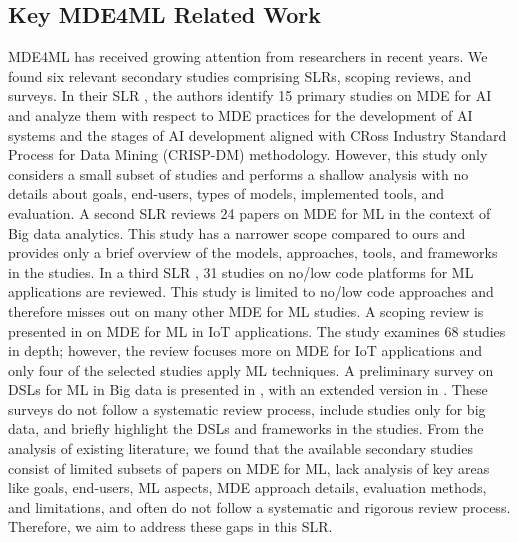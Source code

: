 \subsection{Key MDE4ML Related Work}
MDE4ML has received growing attention from researchers in recent years. We found six relevant secondary studies comprising SLRs, scoping reviews, and surveys. In their SLR \cite{raedler2023model}, the authors identify 15 primary studies on MDE for AI and analyze them with respect to MDE practices for the development of AI systems and the stages of AI development aligned with CRoss Industry Standard Process for Data Mining (CRISP-DM) \cite{wirth2000crisp} methodology. However, this study only considers a small subset of studies and performs a shallow analysis with no details about goals, end-users, types of models, implemented tools, and evaluation. A second SLR \cite{zafar2017systematic} reviews 24 papers on MDE for ML in the context of Big data analytics. This study has a narrower scope compared to ours and provides only a brief overview of the models, approaches, tools, and frameworks in the studies. In a third SLR \cite{li2022can}, 31 studies on no/low code platforms for ML applications are reviewed. This study is limited to no/low code approaches and therefore misses out on many other MDE for ML studies. A scoping review is presented in \cite{mardani2023model} on MDE for ML in IoT applications. The study examines 68 studies in depth; however, the review focuses more on MDE for IoT applications and only four of the selected studies apply ML techniques. A preliminary survey on DSLs for ML in Big data is presented in \cite{portugal2016preliminary}, with an extended version in \cite{portugal2016survey}. These surveys do not follow a systematic review process, include studies only for big data, and briefly highlight the DSLs and frameworks in the studies. From the analysis of existing literature, we found that the available secondary studies consist of limited subsets of papers on MDE for ML, lack analysis of key areas like goals, end-users, ML aspects, MDE approach details, evaluation methods, and limitations, and often do not follow a systematic and rigorous review process. Therefore, we aim to address these gaps in this SLR.

